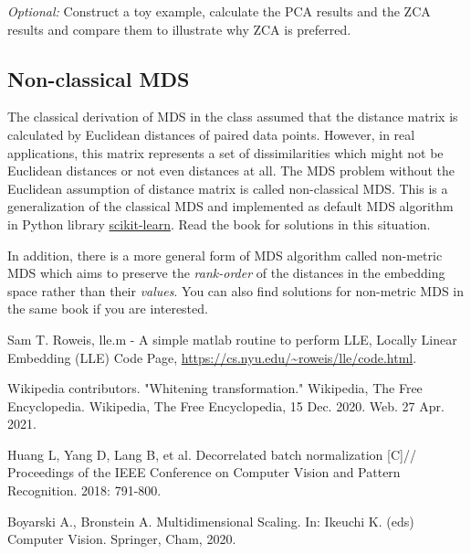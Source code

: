 \documentclass{article}
\begin{document}
\emph{Optional:} Construct a toy example, calculate the PCA results and the ZCA results and compare them to illustrate why ZCA is preferred.


\subsection*{Non-classical MDS}

The classical derivation of MDS in the class assumed that the distance matrix is calculated by Euclidean distances of paired data points. However, in real applications, this matrix represents a set of dissimilarities which might not be Euclidean distances or not even distances at all. The MDS problem without the Euclidean assumption of distance matrix is called non-classical MDS. This is a generalization of the classical MDS and implemented as default MDS algorithm in Python library \href{https://scikit-learn.org/stable/modules/manifold.html#multidimensional-scaling}{scikit-learn}. Read the book \cite{MDS} for solutions in this situation.

In addition, there is a more general form of MDS algorithm called non-metric MDS which aims to preserve the \emph{rank-order} of the distances in the embedding space rather than their \emph{values}. You can also find solutions for non-metric MDS in the same book \cite{MDS} if you are interested.

\begin{thebibliography}{1}


Sam T. Roweis, lle.m - A simple matlab routine to perform LLE, Locally Linear Embedding (LLE) Code Page, \url{https://cs.nyu.edu/~roweis/lle/code.html}.

Wikipedia contributors. "Whitening transformation." Wikipedia, The Free Encyclopedia. Wikipedia, The Free Encyclopedia, 15 Dec. 2020. Web. 27 Apr. 2021. 

Huang L, Yang D, Lang B, et al. Decorrelated batch normalization [C]// Proceedings of the IEEE Conference on Computer Vision and Pattern Recognition. 2018: 791-800.

Boyarski A., Bronstein A. Multidimensional Scaling. In: Ikeuchi K. (eds) Computer Vision. Springer, Cham, 2020.

\end{thebibliography}
\end{document}
